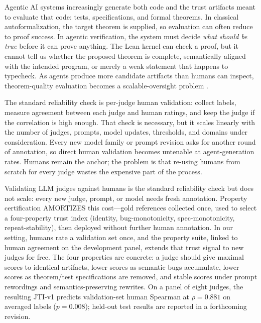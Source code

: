 \documentclass{article}
\begin{document}
Agentic AI systems increasingly generate both code and the trust artifacts meant to evaluate that code: tests, specifications, and formal theorems.
In classical autoformalization, the target theorem is supplied, so evaluation can often reduce to proof success.
In agentic verification, the system must decide \emph{what should be true} before it can prove anything.
The Lean kernel can check a proof, but it cannot tell us whether the proposed theorem is complete, semantically aligned with the intended program, or merely a weak statement that happens to typecheck.
As agents produce more candidate artifacts than humans can inspect, theorem-quality evaluation becomes a scalable-oversight problem \citep{bowman2022scalable,zhou2025graders,khattab2024dspy,cheng2024trace}.

The standard reliability check is per-judge human validation: collect labels, measure agreement between each judge and human ratings, and keep the judge if the correlation is high enough.
That check is necessary, but it scales linearly with the number of judges, prompts, model updates, thresholds, and domains under consideration.
Every new model family or prompt revision asks for another round of annotation, so direct human validation becomes untenable at agent-generation rates.
Humans remain the anchor; the problem is that re-using humans from scratch for every judge wastes the expensive part of the process.

Validating LLM judges against humans is the standard reliability check but does not scale: every new judge, prompt, or model needs fresh annotation.
Property certification AMORTIZES this cost---gold references collected once, used to select a four-property trust index (identity, bug-monotonicity, spec-monotonicity, repeat-stability), then deployed without further human annotation.
In our setting, humans rate a validation set once, and the property suite, linked to human agreement on the development panel, extends that trust signal to new judges for free.
The four properties are concrete: a judge should give maximal scores to identical artifacts, lower scores as semantic bugs accumulate, lower scores as theorem/test specifications are removed, and stable scores under prompt rewordings and semantics-preserving rewrites.
On a panel of eight judges, the resulting JTI-v1 predicts validation-set human Spearman at \(\rho=0.881\) on averaged labels (\(p=0.008\)); held-out test results are reported in a forthcoming revision.
\end{document}
